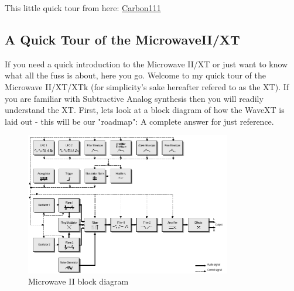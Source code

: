This little quick tour from here: \href{https://www.carbon111.com/xt_intro.html}{Carbon111}
\subsection{A Quick Tour of the MicrowaveII/XT}
If you need a quick introduction to the Microwave II/XT or just want to know what all the fuss is about, here you go.
Welcome to my quick tour of the Microwave II/XT/XTk (for simplicity's sake hereafter refered to as the XT). If you are familiar with Subtractive Analog synthesis then you will readily understand the XT. First, lets look at a block diagram of how the WaveXT is laid out - this will be our "roadmap":
A complete answer for just reference.
\bigskip %
%
\begin{figure}[ht!]
	\centering
	\includegraphics[width=90mm]{pics/mwxt_block.png}
	\caption{Microwave II block diagram}
	\label{blockdiagrammwxt}
\end{figure}
